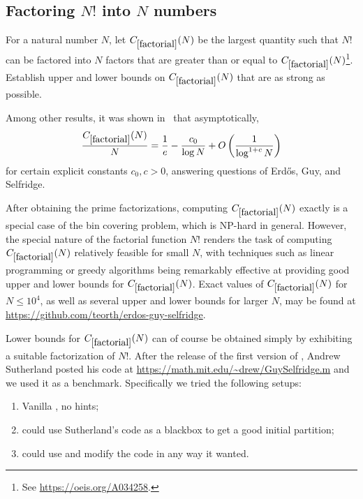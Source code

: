 \subsection{Factoring $N!$ into $N$ numbers}

\renewcommand{\problemURL}{https://google-deepmind.github.io/alphaevolve_repository_of_problems/problems/38.html}

\begin{problem}\label{factorial}
For a natural number $N$, let $C_{\ref{factorial}}(N)$ be the largest quantity such that $N!$ can be factored into $N$ factors that are greater than or equal to $C_{\ref{factorial}}(N)$\footnote{See \href{OEIS A034258}{https://oeis.org/A034258}.}.  Establish upper and lower bounds on
$C_{\ref{factorial}}(N)$ that are as strong as possible.
\end{problem}

Among other results, it was shown in~\cite{ventullo} that asymptotically,
$$\frac{C_{\ref{factorial}}(N)}{N} = \frac{1}{e} - \frac{c_0}{\log N} + O\left( \frac{1}{\log^{1+c} N}\right)$$
for certain explicit constants $c_0, c > 0$, answering questions of Erd\H{o}s, Guy, and Selfridge.

After obtaining the prime factorizations, computing $C_{\ref{factorial}}(N)$ exactly is  a special case of the bin covering problem, which is NP-hard in general.  However, the special nature of the factorial function $N!$ renders the task of computing $C_{\ref{factorial}}(N)$ relatively feasible for small $N$, with techniques such as linear programming or greedy algorithms being remarkably effective at providing good upper and lower bounds for $C_{\ref{factorial}}(N)$.  Exact values of $C_{\ref{factorial}}(N)$ for $N \leq 10^4$, as well as several upper and lower bounds for larger $N$, may be found at \url{https://github.com/teorth/erdos-guy-selfridge}.

Lower bounds for $C_{\ref{factorial}}(N)$ can of course be obtained simply by exhibiting a suitable factorization of $N!$.
After the release of the first version of \cite{ventullo}, Andrew Sutherland posted his code at 
\url{https://math.mit.edu/~drew/GuySelfridge.m} and we used it as a benchmark. Specifically we tried the following setups:

\begin{enumerate}

\item Vanilla \AlphaEvolve, no hints;
\item \AlphaEvolve could use Sutherland's code as a blackbox to get a good initial partition;
\item \AlphaEvolve could use and modify the code in any way it wanted.
\end{enumerate}


